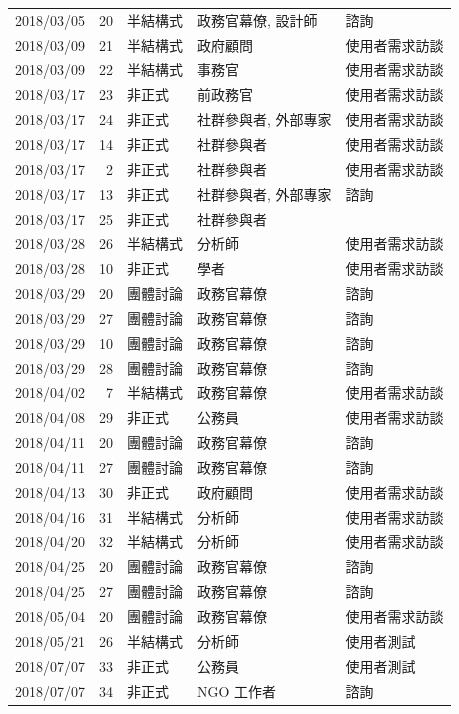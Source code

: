 \documentclass[12pt,a4paper]{article}
\begin{document}
\begin{table}[htbp]
\begin{tabular}{lrlll}
2018/03/05 & 20 & 半結構式 & 政務官幕僚, 設計師 & 諮詢\\
2018/03/09 & 21 & 半結構式 & 政府顧問 & 使用者需求訪談\\
2018/03/09 & 22 & 半結構式 & 事務官 & 使用者需求訪談\\
2018/03/17 & 23 & 非正式 & 前政務官 & 使用者需求訪談\\
2018/03/17 & 24 & 非正式 & 社群參與者, 外部專家 & 使用者需求訪談\\
2018/03/17 & 14 & 非正式 & 社群參與者 & 使用者需求訪談\\
2018/03/17 & 2 & 非正式 & 社群參與者 & 使用者需求訪談\\
2018/03/17 & 13 & 非正式 & 社群參與者, 外部專家 & 諮詢\\
2018/03/17 & 25 & 非正式 & 社群參與者 & \\
2018/03/28 & 26 & 半結構式 & 分析師 & 使用者需求訪談\\
2018/03/28 & 10 & 非正式 & 學者 & 使用者需求訪談\\
2018/03/29 & 20 & 團體討論 & 政務官幕僚 & 諮詢\\
2018/03/29 & 27 & 團體討論 & 政務官幕僚 & 諮詢\\
2018/03/29 & 10 & 團體討論 & 政務官幕僚 & 諮詢\\
2018/03/29 & 28 & 團體討論 & 政務官幕僚 & 諮詢\\
2018/04/02 & 7 & 半結構式 & 政務官幕僚 & 使用者需求訪談\\
2018/04/08 & 29 & 非正式 & 公務員 & 使用者需求訪談\\
2018/04/11 & 20 & 團體討論 & 政務官幕僚 & 諮詢\\
2018/04/11 & 27 & 團體討論 & 政務官幕僚 & 諮詢\\
2018/04/13 & 30 & 非正式 & 政府顧問 & 使用者需求訪談\\
2018/04/16 & 31 & 半結構式 & 分析師 & 使用者需求訪談\\
2018/04/20 & 32 & 半結構式 & 分析師 & 使用者需求訪談\\
2018/04/25 & 20 & 團體討論 & 政務官幕僚 & 諮詢\\
2018/04/25 & 27 & 團體討論 & 政務官幕僚 & 諮詢\\
2018/05/04 & 20 & 團體討論 & 政務官幕僚 & 使用者需求訪談\\
2018/05/21 & 26 & 半結構式 & 分析師 & 使用者測試\\
2018/07/07 & 33 & 非正式 & 公務員 & 使用者測試\\
2018/07/07 & 34 & 非正式 & NGO 工作者 & 諮詢\\

\end{tabular}
\end{table}
\end{document}
